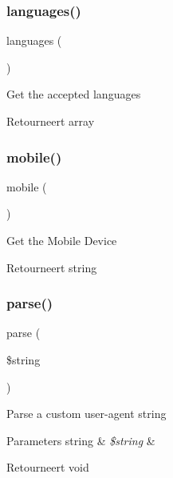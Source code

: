 \subsubsection{\texorpdfstring{languages()}{languages()}}
{\footnotesize\ttfamily languages (\begin{DoxyParamCaption}{ }\end{DoxyParamCaption})}

Get the accepted languages

\begin{DoxyReturn}{Retourneert}
array 
\end{DoxyReturn}
\mbox{\label{class_c_i___user__agent_a8e13f70e084cbb413d7b68805f3b09dd}} 
\subsubsection{\texorpdfstring{mobile()}{mobile()}}
{\footnotesize\ttfamily mobile (\begin{DoxyParamCaption}{ }\end{DoxyParamCaption})}

Get the Mobile Device

\begin{DoxyReturn}{Retourneert}
string 
\end{DoxyReturn}
\mbox{\label{class_c_i___user__agent_a8652be52c4455b8ce1a8e79fdb083703}} 
\subsubsection{\texorpdfstring{parse()}{parse()}}
{\footnotesize\ttfamily parse (\begin{DoxyParamCaption}\item[{}]{\$string }\end{DoxyParamCaption})}

Parse a custom user-\/agent string


\begin{DoxyParams}[1]{Parameters}
string & {\em \$string} & \\
\hline
\end{DoxyParams}
\begin{DoxyReturn}{Retourneert}
void 
\end{DoxyReturn}
\mbox{\label{class_c_i___user__agent_ad69bddb2ba31b27415484b3da4213ba8}} 
